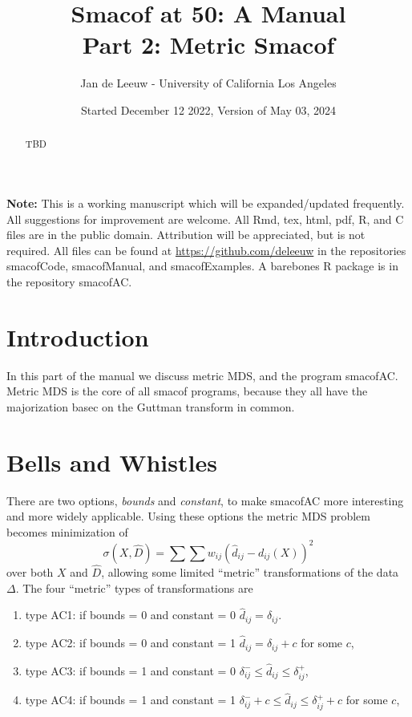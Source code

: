 \documentclass[
  12pt,
]{article}
\title{Smacof at 50: A Manual\\
Part 2: Metric Smacof}
\author{Jan de Leeuw - University of California Los Angeles}
\date{Started December 12 2022, Version of May 03, 2024}
\providecommand{\tightlist}{%
  \setlength{\itemsep}{0pt}\setlength{\parskip}{0pt}}
\begin{document}
\maketitle
\begin{abstract}
TBD
\end{abstract}

{
\setcounter{tocdepth}{3}
\tableofcontents
}
\textbf{Note:} This is a working manuscript which will be expanded/updated
frequently. All suggestions for improvement are welcome. All Rmd, tex,
html, pdf, R, and C files are in the public domain. Attribution will be
appreciated, but is not required. All files can be found at
\url{https://github.com/deleeuw} in the repositories smacofCode, smacofManual,
and smacofExamples. A barebones R package is in the repository
smacofAC.

\section{Introduction}\label{introduction}

In this part of the manual we discuss metric MDS, and the program
smacofAC. Metric MDS is the core of all smacof programs, because they
all have the majorization basec on the Guttman transform in common.

\section{Bells and Whistles}\label{bells-and-whistles}

There are two options, \emph{bounds} and \emph{constant}, to make smacofAC more interesting and more widely applicable. Using these options the metric MDS problem becomes minimization of
\[
\sigma(X,\hat D)=\sum\sum w_{ij}(\hat d_{ij}-d_{ij}(X))^2
\]
over both \(X\) and \(\hat D\), allowing some limited ``metric'' transformations of the data \(\Delta\).
The four ``metric'' types of transformations are

\begin{enumerate}
\def\labelenumi{\arabic{enumi}.}
\tightlist
\item
  type AC1: if bounds = 0 and constant = 0 \(\hat d_{ij}=\delta_{ij}\).
\item
  type AC2: if bounds = 0 and constant = 1 \(\hat d_{ij}=\delta_{ij}+c\) for some \(c\),
\item
  type AC3: if bounds = 1 and constant = 0 \(\delta^-_{ij}\leq\hat d_{ij}\leq\delta^+_{ij}\),
\item
  type AC4: if bounds = 1 and constant = 1 \(\delta^-_{ij}+c\leq\hat d_{ij}\leq\delta^+_{ij}+c\) for some \(c\),
\end{enumerate}
\end{document}
